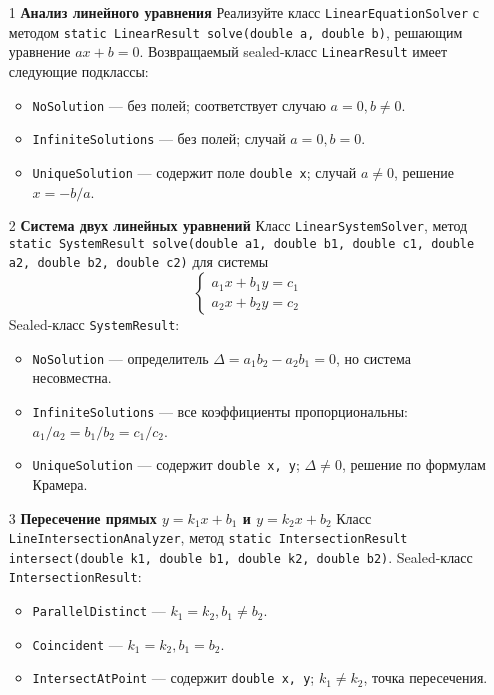 \documentclass[12pt]{article}
\begin{document}
\begin{enumerate}
\item[1] \textbf{Анализ линейного уравнения}
Реализуйте класс \texttt{LinearEquationSolver} с методом
\texttt{static LinearResult solve(double a, double b)}, решающим уравнение \(ax + b = 0\).
Возвращаемый sealed-класс \texttt{LinearResult} имеет следующие подклассы:
\begin{itemize}
\item \texttt{NoSolution} — без полей; соответствует случаю \(a = 0, b \neq 0\).
\item \texttt{InfiniteSolutions} — без полей; случай \(a = 0, b = 0\).
\item \texttt{UniqueSolution} — содержит поле \texttt{double x}; случай \(a \neq 0\), решение \(x = -b/a\).
\end{itemize}

\item[2] \textbf{Система двух линейных уравнений}
Класс \texttt{LinearSystemSolver}, метод
\texttt{static SystemResult solve(double a1, double b1, double c1, double a2, double b2, double c2)} для системы
\[
\begin{cases}
a_1x + b_1y = c_1 \\
a_2x + b_2y = c_2
\end{cases}
\]
Sealed-класс \texttt{SystemResult}:
\begin{itemize}
\item \texttt{NoSolution} — определитель \(\Delta = a_1b_2 - a_2b_1 = 0\), но система несовместна.
\item \texttt{InfiniteSolutions} — все коэффициенты пропорциональны: \(a_1/a_2 = b_1/b_2 = c_1/c_2\).
\item \texttt{UniqueSolution} — содержит \texttt{double x, y}; \(\Delta \neq 0\), решение по формулам Крамера.
\end{itemize}

\item[3] \textbf{Пересечение прямых \(y = k_1x + b_1\) и \(y = k_2x + b_2\)}
Класс \texttt{LineIntersectionAnalyzer}, метод
\texttt{static IntersectionResult intersect(double k1, double b1, double k2, double b2)}.
Sealed-класс \texttt{IntersectionResult}:
\begin{itemize}
\item \texttt{ParallelDistinct} — \(k_1 = k_2, b_1 \neq b_2\).
\item \texttt{Coincident} — \(k_1 = k_2, b_1 = b_2\).
\item \texttt{IntersectAtPoint} — содержит \texttt{double x, y}; \(k_1 \neq k_2\), точка пересечения.
\end{itemize}


\end{enumerate}
\end{document}
